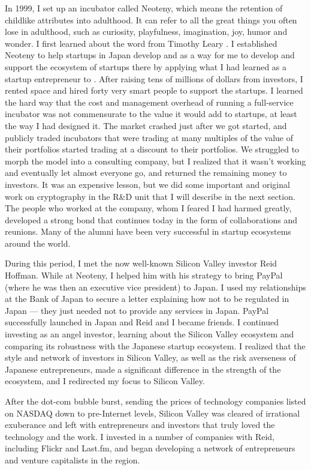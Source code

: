 In 1999, I set up an incubator called Neoteny, which means the retention of childlike attributes into adulthood. It can refer to all the great things you often lose in adulthood, such as curiosity, playfulness, imagination, joy, humor and wonder. I first learned about the word from Timothy Leary \cite{TheMeani97:online}. I established Neoteny to help startups in Japan develop and as a way for me to develop and support the ecosystem of startups there by applying what I had learned as a startup entrepreneur to . After raising tens of millions of dollars from investors, I rented space and hired forty very smart people to support the startups. I learned the hard way that the cost and management overhead of running a full-service incubator was not commensurate to the value it would add to startups, at least the way I had designed it. The market crashed just after we got started, and publicly traded incubators that were trading at many multiples of the value of their portfolios started trading at a discount to their portfolios. We struggled to morph the model into a consulting company, but I realized that it wasn’t working and eventually let almost everyone go, and returned the remaining money to investors. It was an expensive lesson, but we did some important and original work on cryptography in the R\&D unit that I will describe in the next section. The people who worked at the company, whom I feared I had harmed greatly, developed a strong bond that continues today in the form of collaborations and reunions. Many of the alumni have been very successful in startup ecosystems around the world. 

During this period, I met the now well-known Silicon Valley investor Reid Hoffman. While at Neoteny, I helped him with his strategy to bring PayPal (where he was then an executive vice president) to Japan. I used my relationships at the Bank of Japan to secure a letter explaining how not to be regulated in Japan --- they just needed not to provide any services in Japan. PayPal successfully launched in Japan and Reid and I became friends. I continued investing as an angel investor, learning about the Silicon Valley ecosystem and comparing its robustness with the Japanese startup ecosystem. I realized that the style and network of investors in Silicon Valley, as well as the risk averseness of Japanese entrepreneurs, made a significant difference in the strength of the ecosystem, and I redirected my focus to Silicon Valley. 

After the dot-com bubble burst, sending the prices of technology companies listed on NASDAQ down to pre-Internet levels, Silicon Valley was cleared of irrational exuberance and left with entrepreneurs and investors that truly loved the technology and the work. I invested in a number of companies with Reid, including Flickr and Last.fm, and began developing a network of entrepreneurs and venture capitalists in the region. 

